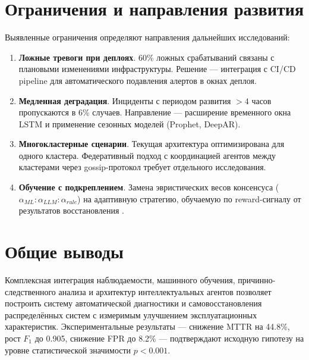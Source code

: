 \section*{Ограничения и направления развития}

Выявленные ограничения определяют направления дальнейших исследований:

\begin{enumerate}
    \item \textbf{Ложные тревоги при деплоях}. 60\% ложных срабатываний связаны с плановыми изменениями инфраструктуры. Решение --- интеграция с CI/CD pipeline для автоматического подавления алертов в окнах деплоя.

    \item \textbf{Медленная деградация}. Инциденты с периодом развития $> 4$ часов пропускаются в 6\% случаев. Направление --- расширение временного окна LSTM и применение сезонных моделей (Prophet, DeepAR).

    \item \textbf{Многокластерные сценарии}. Текущая архитектура оптимизирована для одного кластера. Федеративный подход с координацией агентов между кластерами через gossip-протокол требует отдельного исследования.

    \item \textbf{Обучение с подкреплением}. Замена эвристических весов консенсуса ($\alpha_{ML}:\alpha_{LLM}:\alpha_{rule}$) на адаптивную стратегию, обучаемую по reward-сигналу от результатов восстановления \cite{goodfellow_deep_learning,murphy_machine_learning}.
\end{enumerate}

\section*{Общие выводы}

Комплексная интеграция наблюдаемости, машинного обучения, причинно-следственного анализа и архитектур интеллектуальных агентов позволяет построить систему автоматической диагностики и самовосстановления распределённых систем с измеримым улучшением эксплуатационных характеристик. Экспериментальные результаты --- снижение MTTR на 44.8\%, рост $F_1$ до 0.905, снижение FPR до 8.2\% --- подтверждают исходную гипотезу на уровне статистической значимости $p < 0.001$.

